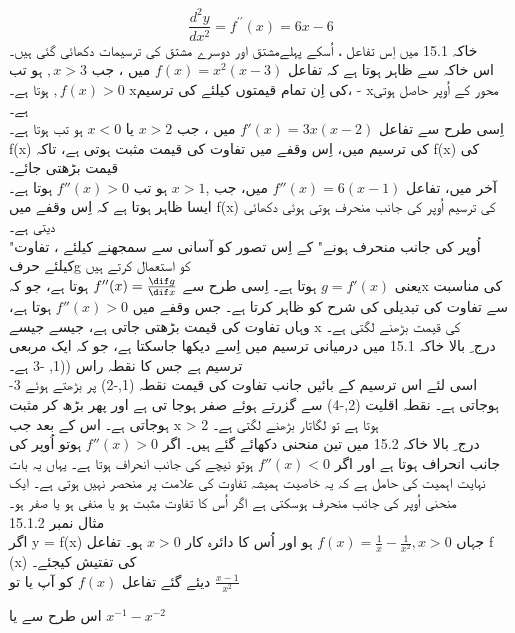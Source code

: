 \[\frac{d^{2}y}{dx^{2}}=f^{\prime\prime}\left(x\right)=6x-6 \]
خاکہ  15.1  میں اِس تفاعل ،  اُسکے پہلےمشتق  اور دوسرے مشتق کی ترسیمات دکھائی گئی ہیں۔ \\
اس خاکہ سے ظاہر ہوتا ہے کہ  تفاعل
\(f(x)=x^2(x-3)\)
  میں ،  
  جب 
\(,x>3\)
     ہو تب 
\(,f(x)>0\)
     ہوتا ہے۔  xکی اِن تمام قیمتوں کیلئے کی ترسیم،   - xمحور کے اُوپر حاصل ہوتی ہے۔ \\
اِسی طرح سے تفاعل 
\(f'(x)=3x(x-2)\)
میں ،  جب
\(x>2\)
 یا  
 \(x<0\)
  ہو تب ہوتا ہے۔
   f(x)
 کی ترسیم میں،  اِس وقفے میں تفاوت کی قیمت مثبت ہوتی ہے، تاکہ f(x) کی قیمت بڑھتی جائے۔ \\
آخر میں،  تفاعل 
\(f''(x)=6(x-1)\)
میں،  
جب
,\(x>1\)
 ہو تب
  \(f''(x)>0\)
  ہوتا ہے۔ ایسا ظاہر ہوتا ہے کہ اِس وقفے میں f(x)  کی ترسیم اُوپر کی جانب منحرف ہوتی ہوئی دکھائی دیتی ہے۔ \\
"اُوپر کی جانب منحرف ہونے"   کے اِس تصور کو آسانی سے سمجھنے کیلئے ، تفاوت کیلئے حرفg  کو استعمال کرتے ہیں\\
 یعنی
\(g=f'(x)\)
 ہوتا ہے۔  اِسی طرح سے 
\(f''(x)=\frac{\dif g}{\dif x}\)
 ہوتا ہے،   جو کہx  کی مناسبت سے تفاوت کی تبدیلی کی شرح کو ظاہر کرتا ہے۔ جس وقفے میں
  \(f''(x)>0\)
 ہوتا ہے،  وہاں تفاوت کی قیمت بڑھتی جاتی ہے،  جیسے جیسے x   کی قیمت بڑھنے لگتی ہے۔ \\
درج  ِ بالا خاکہ  15.1   میں درمیانی ترسیم میں اِسے دیکھا جاسکتا ہے،  جو کہ ایک مربعی ترسیم ہے جس کا نقطہ راس ((1, -3   ہے۔\\
اسی لئے اس ترسیم کے بائیں جانب تفاوت کی قیمت نقطہ (1,-2)  پر بڑھتے ہوئے 3-  ہوجاتی ہے۔  نقطہ اقلیت (2,-4)  سے گزرتے ہوئے صفر ہوجا تی ہے اور پھر بڑھ کر مثبت ہوجاتی ہے۔ اس کے بعد جب x > 2  ہوتا ہے تو لگاتار بڑھنے لگتی ہے۔ \\
درج  ِ بالا خاکہ  15.2   میں تین منحنی دکھائے گئے ہیں۔  اگر 
  \(f''(x)>0\)
ہوتو  اُوپر کی جانب انحراف ہوتا ہے  اور اگر
  \(f''(x)<0\) 
  ہوتو  نیچے کی جانب انحراف ہوتا ہے۔   یہاں یہ بات نہایت اہمیت کی حامل ہے کہ یہ خاصیت ہمیشہ تفاوت کی علامت پر منحصر نہیں ہوتی ہے۔ ایک منحنی اُوپر کی جانب منحرف ہوسکتی ہے  اگر  اُس کا تفاوت مثبت  ہو یا  منفی  ہو  یا  صفر ہو۔ \\
مثال نمبر  15.1.2  \\
  اگر  y = f(x)     جہاں  
  \(f(x)=\frac{1}{x}- \frac{1}{x^{2}},x>0\)
   ہو اور اُس کا دائرہ کار   
   \(x>0\)
    ہو۔ تفاعل  f (x) کی تفتیش کیجئے۔\\
دیئے گئے تفاعل 
\(f(x)\)
   کو آپ یا تو 
   \( \frac{x-1}{x^{2}}  \)

       اس طرح  سے  یا   
    \( x^{-1}-x^{-2} \)

